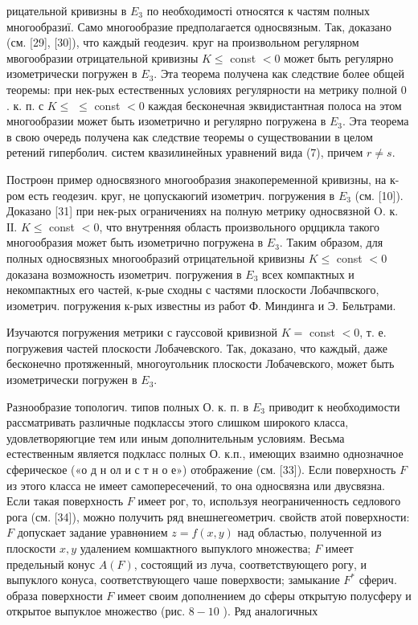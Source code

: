 \documentclass[10pt]{article}
\begin{document}
рицательной кривизны в $E_{3}$ по необходимості относятся к частям полных многообразиї. Само многообразие предполагается односвязным. Так, доказано (см. [29], [30]), что каждый геодезич. круг на произвольном регулярном мвогообразии отрицательной кривизны $K \leqslant$ const $<0$ может быть регулярно изометрически погружен в $E_{3}$. Эта теорема получена как следствие более общей теоремы: при нек-рых естественных условиях регулярности на метрику полной 0 . к. п. с $K \leqslant$ $\leqslant$ const $<0$ каждая бесконечная эквидистантная полоса на этом многообразии может быть изометрично и регулярно погружена в $E_{3}$. Эта теорема в свою очередь получена как следствие теоремы о существовании в целом ретений гиперболич. систем квазилинейных уравнений вида (7), причем $r \neq s$.

Построөн пример односвязного многообразия знакопеременной кривизны, на к-ром есть геодезич. круг, не цопускаюгий изометрич. погружения в $E_{3}$ (см. [10]). Доказано [31] при нек-рых ограничениях на полную метрику односвязной $\mathrm{O}$. к. ІІ. $K \leqslant$ const $<0$, что внутренняя область произвольного орџцикла такого многообразия может быть изометрично погружена в $E_{3}$. Таким образом, для полных односвязных многообразий отрицательной кривизны $K \leqslant$ const $<0$ доказана возможность изометрич. погружения в $E_{3}$ всех компактных и некомпактных его частей, к-рые сходны с частями плоскости Лобачпвского, изометрич. погружения к-рых известны из работ Ф. Миндинга и Э. Бельтрами.

Изучаются погружения метрики с гауссовой кривизной $K=$ const $<0$, т. е. погружевия частей плоскости Лобачевского. Так, доказано, что каждый, даже бесконечно протяженный, многоугольник плоскости Лобачевского, может быть изометрически погружен в $E_{3}$.

Разнообразие топологич. типов полных О. к. п. в $E_{3}$ приводит к необходимости рассматривать различные подклассы этого слишком широкого класса, удовлетворяюгцие тем или иным дополнительным условиям. Весьма естественным является подкласс полных О. к.п., имеющих взаимно однозначное сферическое («о д н ол и с т н о е») отображение (см. [33]). Если поверхность $F$ из этого класса не имеет самопересечений, то она односвязна или двусвязна. Если такая поверхность $F$ имеет рог, то, используя неограниченность седлового рога (см. [34]), можно получить ряд внешнегеометрич. свойств атой поверхности: $F$ допускает задание уравнөнием $z=f(x, y)$ над областью, полученной из плоскости $x, y$ удалением комшактного выпуклого множества; $F$ имеет предельный конус $A(F)$, состоящий из луча, соответствующего рогу, и выпуклого конуса, соответствующего чаше поверхвости; замыкание $F^{*}$ сферич. образа поверхности $F$ имеет своим дополнением до сферы открытую полусферу и открытое выпуклое множество (рис. $8-10$ ). Ряд аналогичных
\end{document}
